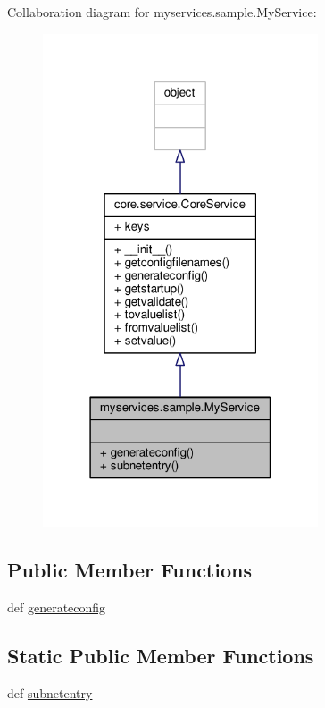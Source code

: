 Collaboration diagram for myservices.\+sample.\+My\+Service\+:
\nopagebreak
\begin{figure}[H]
\begin{center}
\leavevmode
\includegraphics[width=231pt]{classmyservices_1_1sample_1_1_my_service__coll__graph}
\end{center}
\end{figure}
\subsection*{Public Member Functions}
\begin{DoxyCompactItemize}
\item 
def \hyperlink{classmyservices_1_1sample_1_1_my_service_aadc15e6c45b5080e6d63dd9c4cdc3882}{generateconfig}
\end{DoxyCompactItemize}
\subsection*{Static Public Member Functions}
\begin{DoxyCompactItemize}
\item 
def \hyperlink{classmyservices_1_1sample_1_1_my_service_a19e19bb6f9d9f26bbae42f2a74749978}{subnetentry}
\end{DoxyCompactItemize}
